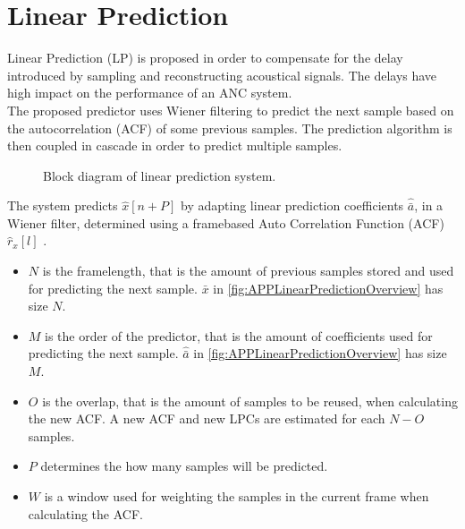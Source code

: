 \section{Linear Prediction}
Linear Prediction (LP) is proposed in order to compensate for the delay introduced by sampling and reconstructing acoustical signals. The delays have high impact on the performance of an ANC system. \\
The proposed predictor uses Wiener filtering to predict the next sample based on the autocorrelation (ACF) of some previous samples. The prediction algorithm is then coupled in cascade in order to predict multiple samples. 

\begin{figure}[H]
	\centering
	
	\caption{Block diagram of linear prediction system.}
	\label{fig:APPLinearPredictionOverview}
\end{figure}
The system predicts $\hat{x}[n+P]$ by adapting linear prediction coefficients $\hat{\bar{a}}$, in a Wiener filter, determined using a framebased Auto Correlation Function (ACF) $\hat{r}_x[l]$ \cite{LinearPrediction}.

\begin{itemize} 
	\item $N$ is the framelength, that is the amount of previous samples stored and used for predicting the next sample. $\bar{x}$ in \autoref{fig:APPLinearPredictionOverview} has size $N$.
	\item $M$ is the order of the predictor, that is the amount of coefficients used for predicting the next sample. $\hat{\bar{a}}$ in \autoref{fig:APPLinearPredictionOverview} has size $M$.
	\item $O$ is the overlap, that is the amount of samples to be reused, when calculating the new ACF. A new ACF and new LPCs are estimated for each $N-O$ samples.
	\item $P$ determines the how many samples will be predicted. 
	\item $W$ is a window used for weighting the samples in the current frame when calculating the ACF. 
\end{itemize}


